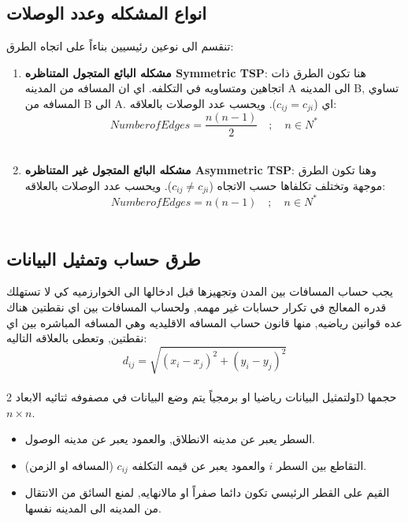 \documentclass{article}
\newcommand{\en}[1]{\textenglish{#1}}
\begin{document}
\subsection{انواع المشكله وعدد الوصلات}
تنقسم الى نوعين رئيسيين بناءاً على اتجاه الطرق:

\begin{enumerate}
	\item \textbf {مشكله البائع المتجول المتناظره \en{Symmetric TSP}}:
هنا تكون الطرق ذات اتجاهين ومتساويه في التكلفه. اي ان المسافه من المدينه \en{A} الى المدينه \en{B}, تساوي المسافه من \en{B} الى \en{A}. اي ($c_{ij} = c_{ji}$). ويحسب عدد الوصلات بالعلاقه:\\

	{\LARGE $$
	Number of Edges = \frac{n(n - 1)}{2} \quad ; \quad n \in N^*
	$$}\\

	\item \textbf{ مشكله البائع المتجول غير المتناظره \en{Asymmetric TSP}}:
وهنا تكون الطرق موجهة وتختلف تكلفاها حسب الاتجاه ($c_{ij} \not = c_{ji}$). ويحسب عدد الوصلات بالعلاقه: \\

	{\LARGE $$
	Number of Edges = {n(n - 1)} \quad ; \quad n \in N^*
	$$}\\

\end{enumerate}

\subsection{طرق حساب وتمثيل البيانات}
يجب حساب المسافات بين المدن وتجهيزها قبل ادخالها الى الخوارزميه كي لا تستهلك قدره المعالج في تكرار حسابات غير مهمه, ولحساب المسافات بين اي نقطتين هناك عده قوانين رياضيه, منها قانون حساب المسافه الاقليديه وهي المسافه المباشره بين اي نقطتين, وتعطى بالعلاقه التاليه:\\

{\LARGE
$$
d_{ij} = \sqrt{(x_i - x_j)^2 + (y_i - y_j)^2}
$$}\\

ولتمثيل البيانات رياضيا او برمجياً  يتم وضع البيانات في مصفوفه ثتائيه الابعاد  2D  حجمها {\large$n \times n$}.

\begin{itemize}
	\item السطر يعبر عن مدينه الانطلاق, والعمود يعبر عن مدينه الوصول.
	\item التقاطع بين السطر $i$ والعمود يعبر عن قيمه التكلفه $c_{ij}$ (المسافه او الزمن).
	\item القيم على القطر الرئيسي تكون دائما صفراً او مالانهايه, لمنع السائق من الانتقال من المدينه الى المدينه نفسها.
\end{itemize}
\end{document}
